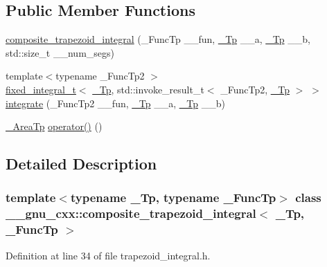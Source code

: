 \subsection*{Public Member Functions}
\begin{DoxyCompactItemize}
\item 
\hyperlink{class____gnu__cxx_1_1composite__trapezoid__integral_a168c2e7ecd8c89e87cc308e756c486ed}{composite\+\_\+trapezoid\+\_\+integral} (\+\_\+\+Func\+Tp \+\_\+\+\_\+fun, \hyperlink{namespace____gnu__cxx_a3b19a9c800ca194374ef9172290f7d79}{\+\_\+\+Tp} \+\_\+\+\_\+a, \hyperlink{namespace____gnu__cxx_a3b19a9c800ca194374ef9172290f7d79}{\+\_\+\+Tp} \+\_\+\+\_\+b, std\+::size\+\_\+t \+\_\+\+\_\+num\+\_\+segs)
\item 
{\footnotesize template$<$typename \+\_\+\+Func\+Tp2 $>$ }\\\hyperlink{struct____gnu__cxx_1_1fixed__integral__t}{fixed\+\_\+integral\+\_\+t}$<$ \hyperlink{namespace____gnu__cxx_a3b19a9c800ca194374ef9172290f7d79}{\+\_\+\+Tp}, std\+::invoke\+\_\+result\+\_\+t$<$ \+\_\+\+Func\+Tp2, \hyperlink{namespace____gnu__cxx_a3b19a9c800ca194374ef9172290f7d79}{\+\_\+\+Tp} $>$ $>$ \hyperlink{class____gnu__cxx_1_1composite__trapezoid__integral_a8897329b7ae73a8e41028519fab78b81}{integrate} (\+\_\+\+Func\+Tp2 \+\_\+\+\_\+fun, \hyperlink{namespace____gnu__cxx_a3b19a9c800ca194374ef9172290f7d79}{\+\_\+\+Tp} \+\_\+\+\_\+a, \hyperlink{namespace____gnu__cxx_a3b19a9c800ca194374ef9172290f7d79}{\+\_\+\+Tp} \+\_\+\+\_\+b)
\item 
\hyperlink{class____gnu__cxx_1_1composite__trapezoid__integral_a0839ba042e2636869679bbf343b2a930}{\+\_\+\+Area\+Tp} \hyperlink{class____gnu__cxx_1_1composite__trapezoid__integral_aad283e15b63ce1ad40cdaa834ec4fcb6}{operator()} ()
\end{DoxyCompactItemize}


\subsection{Detailed Description}
\subsubsection*{template$<$typename \+\_\+\+Tp, typename \+\_\+\+Func\+Tp$>$\newline
class \+\_\+\+\_\+gnu\+\_\+cxx\+::composite\+\_\+trapezoid\+\_\+integral$<$ \+\_\+\+Tp, \+\_\+\+Func\+Tp $>$}



Definition at line 34 of file trapezoid\+\_\+integral.\+h.



